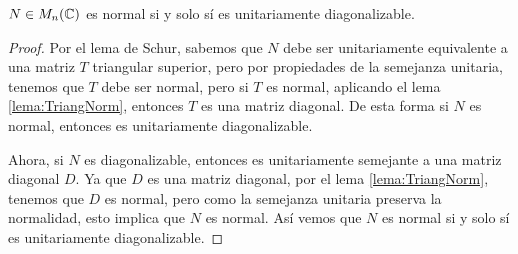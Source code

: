 \begin{teor}
  $N \in M_n(\mathbb{C})$ es normal si y solo sí es unitariamente diagonalizable.
\end{teor}
\begin{proof}
  Por el lema de Schur, sabemos que $N$ debe ser unitariamente equivalente a una matriz $T$ triangular superior, pero por propiedades de la semejanza unitaria, tenemos que $T$ debe ser normal, pero si $T$ es normal, aplicando el lema \ref{lema:TriangNorm}, entonces $T$ es una matriz diagonal. De esta forma si $N$ es normal, entonces es unitariamente diagonalizable.

  Ahora, si $N$ es diagonalizable, entonces es unitariamente semejante a una matriz diagonal $D$. Ya que $D$ es una matriz diagonal, por el lema \ref{lema:TriangNorm}, tenemos que $D$ es normal, pero como la semejanza unitaria preserva la normalidad, esto implica que $N$ es normal. Así vemos que $N$ es normal si y solo sí es unitariamente diagonalizable.
\end{proof}


